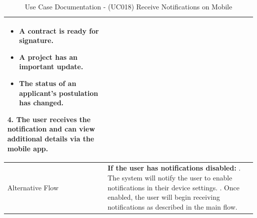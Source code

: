 \documentclass{scrreprt}
\begin{document}
\begin{table}[H]
\begin{tabular}{|p{3cm}|p{10cm}|}
\begin{itemize}
			\item A contract is ready for signature.
			\item A project has an important update.
			\item The status of an applicant's postulation has changed.
		\end{itemize}
		4. The user receives the notification and can view additional details via the mobile app. \\ \hline
		Alternative Flow & 
		\textbf{If the user has notifications disabled:} \newline
		1. The system will notify the user to enable notifications in their device settings. \newline
		2. Once enabled, the user will begin receiving notifications as described in the main flow. \\ \hline
	\end{tabular}
	\caption{Use Case Documentation - (UC018) Receive Notifications on Mobile}
	\label{table:UC018}
\end{table}
\end{document}
